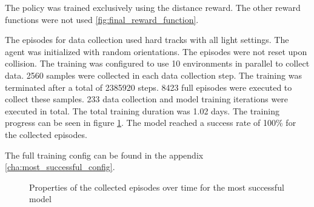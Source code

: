 The policy was trained exclusively using the distance reward. The other reward functions were not used \ref{fig:final_reward_function}.

The episodes for data collection used hard tracks with all light settings. The agent was initialized with random orientations. The episodes were not reset upon collision.
The training was configured to use 10 environments in parallel to collect data. 2560 samples were collected in each data collection step. The training was terminated after a total of 2385920 steps. 8423 full episodes were executed to collect these samples. 233 data collection and model training iterations were executed in total. The total training duration was 1.02 days.
The training progress can be seen in figure \ref{fig:training_most_successful_model}. The model reached a success rate of 100\% for the collected episodes.

The full training config can be found in the appendix \ref{cha:most_successful_config}.

\begin{figure}
    \centering
    \caption{Properties of the collected episodes over time for the most successful model}
    \label{fig:training_most_successful_model}
\end{figure}